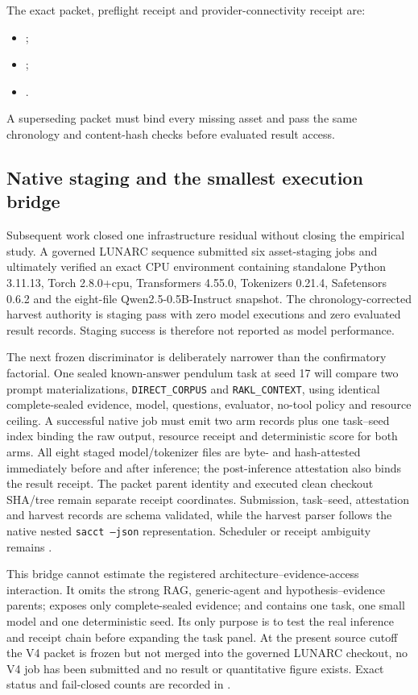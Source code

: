 The exact packet, preflight receipt and provider-connectivity receipt are:
\begin{itemize}[leftmargin=2em]
\item {};

\item {};

\item {}.
\end{itemize}
A superseding packet must bind every missing asset and pass the same chronology and content-hash checks before evaluated result access.

\subsection{Native staging and the smallest execution bridge}

Subsequent work closed one infrastructure residual without closing the empirical
study.  A governed LUNARC sequence submitted six asset-staging jobs and ultimately
verified an exact CPU environment containing standalone Python 3.11.13, Torch
2.8.0+cpu, Transformers 4.55.0, Tokenizers 0.21.4, Safetensors 0.6.2 and the
eight-file Qwen2.5-0.5B-Instruct snapshot.  The chronology-corrected harvest
authority is staging pass with zero model executions and zero evaluated result
records.  Staging success is therefore not reported as model performance.

The next frozen discriminator is deliberately narrower than the confirmatory
factorial.  One sealed known-answer pendulum task at seed 17 will compare two
prompt materializations, \texttt{DIRECT\_CORPUS} and
\texttt{RAKL\_CONTEXT}, using identical complete-sealed evidence, model,
questions, evaluator, no-tool policy and resource ceiling.  A successful native
job must emit two arm records plus one task--seed index binding the raw output,
resource receipt and deterministic score for both arms.  All eight staged
model/tokenizer files are byte- and hash-attested immediately before and after
inference; the post-inference attestation also binds the result receipt.  The
packet parent identity and executed clean checkout SHA/tree remain separate
receipt coordinates.  Submission, task--seed, attestation and harvest records
are schema validated, while the harvest parser follows the native nested
\texttt{sacct --json} representation.  Scheduler or receipt ambiguity remains
\CannotCheck{}.

This bridge cannot estimate the registered architecture--evidence-access
interaction.  It omits the strong RAG, generic-agent and hypothesis--evidence
parents; exposes only complete-sealed evidence; and contains one task, one small
model and one deterministic seed.  Its only purpose is to test the real inference
and receipt chain before expanding the task panel.  At the present source cutoff
the V4 packet is frozen but not merged into the governed LUNARC checkout, no V4
job has been submitted and no result or quantitative figure exists.  Exact status
and fail-closed counts are recorded in
.
